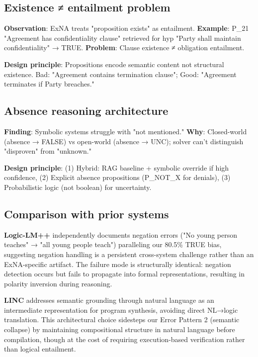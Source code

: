 \documentclass[12pt,a4paper]{article}
\begin{document}
\subsection{Existence ≠ entailment problem}

\textbf{Observation}: ExNA treats "proposition exists" as entailment. \textbf{Example}: P\_21 "Agreement has confidentiality clause" retrieved for hyp "Party shall maintain confidentiality" → TRUE. \textbf{Problem}: Clause existence ≠ obligation entailment.

\noindent
\textbf{Design principle}: Propositions encode semantic content not structural existence. Bad: "Agreement contains termination clause"; Good: "Agreement terminates if Party breaches."

\subsection{Absence reasoning architecture}

\textbf{Finding}: Symbolic systems struggle with "not mentioned." \textbf{Why}: Closed-world (absence → FALSE) vs open-world (absence → UNC); solver can't distinguish "disproven" from "unknown."

\noindent
\textbf{Design principle}: (1) Hybrid: RAG baseline + symbolic override if high confidence, (2) Explicit absence propositions (P\_NOT\_X for denials), (3) Probabilistic logic (not boolean) for uncertainty.

\subsection{Comparison with prior systems}

\textbf{Logic-LM++} \cite{pan2023logiclm,parmar2024logiclmpp} independently documents negation errors ("No young person teaches" → "all young people teach") paralleling our 80.5\% TRUE bias, suggesting negation handling is a persistent cross-system challenge rather than an ExNA-specific artifact. The failure mode is structurally identical: negation detection occurs but fails to propagate into formal representations, resulting in polarity inversion during reasoning.

\textbf{LINC} \cite{olausson2023linc} addresses semantic grounding through natural language as an intermediate representation for program synthesis, avoiding direct NL→logic translation. This architectural choice sidesteps our Error Pattern 2 (semantic collapse) by maintaining compositional structure in natural language before compilation, though at the cost of requiring execution-based verification rather than logical entailment.
\end{document}
